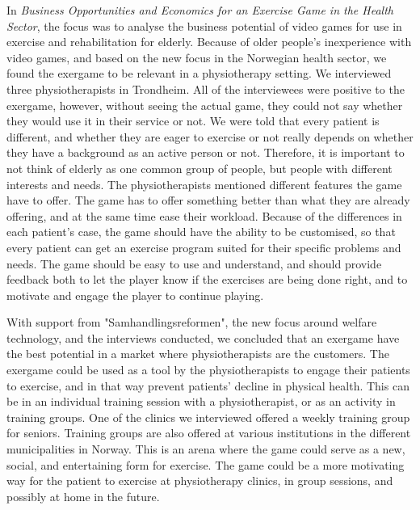 In \emph{Business Opportunities and Economics for an Exercise Game in the Health Sector}, the focus was to analyse the business potential of video games for use in exercise and rehabilitation for elderly.  Because of older people's inexperience with video games, and based on the new focus in the Norwegian health sector, we found the exergame to be relevant in a physiotherapy setting. We interviewed three physiotherapists in Trondheim. All of the interviewees were positive to the exergame, however, without seeing the actual game, they could not say whether they would use it in their service or not. We were told that every patient is different, and whether they are eager to exercise or not really depends on whether they have a background as an active person or not. Therefore, it is important to not think of elderly as one common group of people, but people with different interests and needs. The physiotherapists mentioned different features the game have to offer. The game has to offer something better than what they are already offering, and at the same time ease their workload. Because of the differences in each patient's case, the game should have the ability to be customised, so that every patient can get an exercise program suited for their specific problems and needs. The game should be easy to use and understand, and should provide feedback both to let the player know if the exercises are being done right, and to motivate and engage the player to continue playing. 

With support from "Samhandlingsreformen", the new focus around welfare technology, and the interviews conducted, we concluded that an exergame have the best potential in a market where physiotherapists are the customers. The exergame could be used as a tool by the physiotherapists to engage their patients to exercise, and in that way prevent patients' decline in physical health. This can be in an individual training session with a physiotherapist, or as an activity in training groups. One of the clinics we interviewed offered a weekly training group for seniors. Training groups are also offered at various institutions in the different municipalities in Norway. This is an arena where the game could serve as a new, social, and entertaining form for exercise. The game could be a more motivating way for the patient to exercise at physiotherapy clinics, in group sessions, and possibly at home in the future. 

